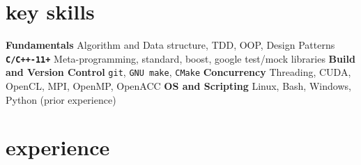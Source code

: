\documentclass[]{twentysecondscv}
\begin{document}
\makeprofile



\section{key skills}
\begin{twentyshort}
  \twentyitemshort
	{\small \textbf{Fundamentals}}
	{\small Algorithm and Data structure, TDD, OOP, Design Patterns}
  \twentyitemshort
    {\small \textbf{\texttt{C/C++-11+}}}
    {\small Meta-programming, standard,  boost, google test/mock libraries}
   \twentyitemshort
    {\small \textbf{Build and Version Control}}
    {\small  \texttt{git}, \texttt{GNU make}, \texttt{CMake}}
  \twentyitemshort
    {\small \textbf{Concurrency}}
    {\small  Threading, CUDA, OpenCL, MPI, OpenMP, OpenACC}
  \twentyitemshort
	{\small \textbf{OS and Scripting}}
	{\small  Linux, Bash, Windows, Python (prior experience)}
\end{twentyshort}



\section{experience}
\end{document}
